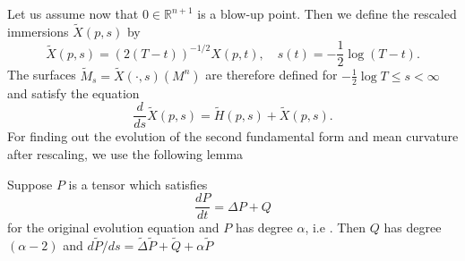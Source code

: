 Let us assume now that $0 \in \mathbb{R}^{n+1}$ is a blow-up point. Then we define the rescaled immersions $\tilde{X}(p, s)$ by
$$
\tilde{X}(p, s)=(2(T-t))^{-1 / 2} X(p, t), \quad s(t)=-\frac{1}{2} \log (T-t) .
$$
The surfaces $\tilde{M}_s=\tilde{X}(\cdot, s)\left(M^n\right)$ are therefore defined for $-\frac{1}{2} \log T \leq s<\infty$ and satisfy the equation
$$
\frac{d}{d s} \tilde{X}(p, s)=\tilde{H}(p, s)+\tilde{X}(p, s).
$$
For finding out the evolution of the second fundamental form and mean curvature after rescaling, we use the following lemma 
\begin{lemma}
    Suppose $P$ is a tensor which satisfies $$ \frac{dP}{dt}=\Delta P+Q$$ for the original evolution equation and $P$ has degree $\alpha$, i.e . Then $Q$ has degree $(\alpha-2)$ and $d \widetilde{P} / d s=\tilde{\Delta} \tilde{P}+\tilde{Q}+\alpha \tilde{P}$
\end{lemma}


\begin{comment}
    \section{Surfaces of positive mean curvature}

From the maximum principle, we know that if the mean curvature of the initial hypersurface $M_0$ is positive then it will stay positive on $M_t$. 
For self-similar solutions, we know that the limiting hypersurface will satisfy the equation $H = \langle x, \nu \rangle$. 
We prove that the sphere is the only compact hypersurface of positive mean curvature moving under self-similarity 
\begin{thm}
If $M^n$, $n\ge 2$, is compact with non-negative mean curvature $H$ and satisfies the equation $H = - \langle X, \nu \rangle$, then $M^n$ is a sphere of radius $\sqrt{n}$. 
\end{thm}
\begin{proof}
Suppose the hypersurface satisfies $H = -\langle X, \nu \rangle$. Let $e_1,\ldots, e_n$ be an orthonormal frame on $M^n$, then 
\begin{align}
    \nabla_{i}H & = - \left< D_{e_{i}}X, \nu \right> - \left< X, \nabla_{e_{i}}\nu \right> \nonumber \\
    & = -\left< e_{i}, \nu \right> - \left< X, \left< \nabla_{e_{i}}\nu,e_{l} \right>e_{l} \right>\nonumber \\ 
    & = \left< X,e_{l} \right>h_{il}
\end{align}
\[\nabla_i \nabla_j H = h_{ij} - Hh_{il}h_{lj}+\langle x, e_l \rangle \nabla_l h_{ij}\]
\end{proof}
\end{comment}
